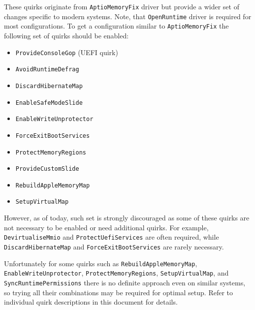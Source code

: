 \documentclass[]{article}
\providecommand{\tightlist}{%
  \setlength{\itemsep}{0pt}\setlength{\parskip}{0pt}}
\begin{document}
\begin{enumerate}
  These quirks originate from \texttt{AptioMemoryFix} driver but provide a wider
  set of changes specific to modern systems. Note, that \texttt{OpenRuntime}
  driver is required for most configurations. To get a configuration similar
  to \texttt{AptioMemoryFix} the following set of quirks should be enabled:
  \begin{itemize}
  \tightlist
  \item \texttt{ProvideConsoleGop} (UEFI quirk)
  \item \texttt{AvoidRuntimeDefrag}
  \item \texttt{DiscardHibernateMap}
  \item \texttt{EnableSafeModeSlide}
  \item \texttt{EnableWriteUnprotector}
  \item \texttt{ForceExitBootServices}
  \item \texttt{ProtectMemoryRegions}
  \item \texttt{ProvideCustomSlide}
  \item \texttt{RebuildAppleMemoryMap}
  \item \texttt{SetupVirtualMap}
  \end{itemize}

  However, as of today, such set is strongly discouraged as some of these quirks
  are not necessary to be enabled or need additional quirks. For example,
  \texttt{DevirtualiseMmio} and \texttt{ProtectUefiServices} are often required,
  while \texttt{DiscardHibernateMap} and \texttt{ForceExitBootServices} are rarely
  necessary.

  Unfortunately for some quirks such as \texttt{RebuildAppleMemoryMap},
  \texttt{EnableWriteUnprotector}, \texttt{ProtectMemoryRegions},
  \texttt{SetupVirtualMap}, and \texttt{SyncRuntimePermissions} there
  is no definite approach even on similar systems, so trying all their
  combinations may be required for optimal setup. Refer to individual quirk
  descriptions in this document for details.

\end{enumerate}
\end{document}
